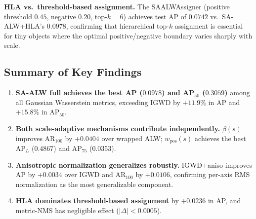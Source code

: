 \textbf{HLA vs.\ threshold-based assignment.} The SAALWAssigner
(positive threshold $0.45$, negative $0.20$, top-$k=6$) achieves test AP
of $0.0742$ vs.\ SA-ALW+HLA's $0.0978$, confirming that hierarchical
top-$k$ assignment is essential for tiny objects where the optimal
positive/negative boundary varies sharply with scale.

\subsection{Summary of Key Findings}
\label{sec:exp-findings}

\begin{enumerate}
  \item \textbf{SA-ALW full achieves the best AP ($0.0978$) and AP$_{50}$
  ($0.3059$)} among all Gaussian Wasserstein metrics, exceeding IGWD by
  $+11.9\%$ in AP and $+15.8\%$ in AP$_{50}$.

  \item \textbf{Both scale-adaptive mechanisms contribute independently.}
  $\beta(s)$ improves AR$_{100}$ by $+0.0404$ over wrapped ALW;
  $w_{\text{pos}}(s)$ achieves the best AP$_{L}$ ($0.4867$) and AP$_{75}$
  ($0.0353$).

  \item \textbf{Anisotropic normalization generalizes robustly.}
  IGWD$+$aniso improves AP by $+0.0034$ over IGWD and AR$_{100}$ by
  $+0.0106$, confirming per-axis RMS normalization as the most
  generalizable component.

  \item \textbf{HLA dominates threshold-based assignment} by $+0.0236$
  in AP, and metric-NMS has negligible effect ($|\Delta|<0.0005$).
\end{enumerate}
